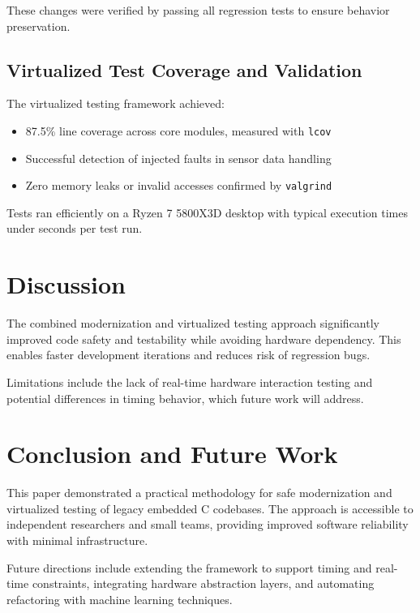 \documentclass[conference]{IEEEtran}
\begin{document}
	These changes were verified by passing all regression tests to ensure behavior preservation.
	
	\subsection{Virtualized Test Coverage and Validation}
	The virtualized testing framework achieved:
	
	\begin{itemize}
		\item 87.5\% line coverage across core modules, measured with \texttt{lcov}
		\item Successful detection of injected faults in sensor data handling
		\item Zero memory leaks or invalid accesses confirmed by \texttt{valgrind}
	\end{itemize}
	
	Tests ran efficiently on a Ryzen 7 5800X3D desktop with typical execution times under seconds per test run.
	
	\section{Discussion}
	The combined modernization and virtualized testing approach significantly improved code safety and testability while avoiding hardware dependency. This enables faster development iterations and reduces risk of regression bugs.
	
	Limitations include the lack of real-time hardware interaction testing and potential differences in timing behavior, which future work will address.
	
	\section{Conclusion and Future Work}
	This paper demonstrated a practical methodology for safe modernization and virtualized testing of legacy embedded C codebases. The approach is accessible to independent researchers and small teams, providing improved software reliability with minimal infrastructure.
	
	Future directions include extending the framework to support timing and real-time constraints, integrating hardware abstraction layers, and automating refactoring with machine learning techniques.
	
	
	
	
\end{document}
